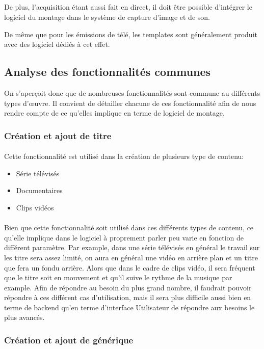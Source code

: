 \subparagraph{}
De plus, l'acquisition étant aussi fait en direct, il doit être possible
d'intégrer le logiciel du montage dans le système de capture d'image et de son.

De même que pour les émissions de télé, les templates sont généralement produit avec des logiciel
dédiés à cet effet.

\subsection{Analyse des fonctionnalités communes}
On s'aperçoit donc que de nombreuses fonctionnalités sont commune au différents
types d'œuvre. Il convient de détailler chacune de ces fonctionnalité afin de
nous rendre compte de ce qu'elles implique en terme de logiciel de montage.

\subsubsection{Création et ajout de titre}
\paragraph{}
Cette fonctionnalité est utilisé dans la création de plusieurs type de contenu:
\begin{itemize}
  \item {Série télévisés}
  \item {Documentaires}
  \item {Clips vidéos}
\end{itemize}
\paragraph{}
Bien que cette fonctionnalité soit utilisé dans ces différents types de contenu,
ce qu'elle implique dans le logiciel à proprement parler peu varie en fonction
de différent paramètre. Par example, dans une série télévisés en général le
travail sur les titre sera assez limité, on aura en général une vidéo en arrière
plan et un titre que fera un fondu arrière. Alors que dans le cadre de clips vidéo,
il sera fréquent que le titre soit en mouvement et qu'il suive le rythme de la
musique par example. Afin de répondre au besoin du plus grand nombre, il faudrait
pouvoir répondre à ces différent cas d'utilisation, mais il sera plus difficile
aussi bien en terme de backend qu'en terme d'interface Utilisateur de répondre
aux besoins le plus avancés.

\subsubsection{Création et ajout de générique}

